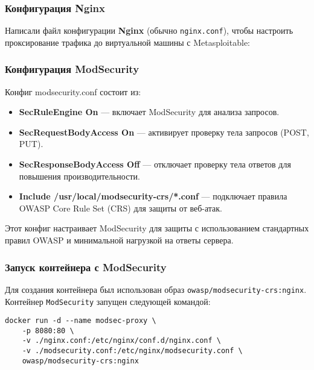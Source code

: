 \subsubsection{Конфигурация Nginx}

Написали файл конфигурации \textbf{Nginx} (обычно \texttt{nginx.conf}),
чтобы настроить проксирование трафика до виртуальной машины с Metasploitable:



\subsubsection{Конфигурация ModSecurity}

Конфиг modsecurity.conf состоит из:

\begin{itemize}
	\item \textbf{SecRuleEngine On}
		--- включает ModSecurity для анализа запросов.
	\item \textbf{SecRequestBodyAccess On}
		--- активирует проверку тела запросов (POST, PUT).
	\item \textbf{SecResponseBodyAccess Off}
		--- отключает проверку тела ответов для повышения производительности.
	\item \textbf{Include /usr/local/modsecurity-crs/*.conf}
		--- подключает правила OWASP Core Rule Set (CRS)
		для защиты от веб-атак.
\end{itemize}

Этот конфиг настраивает ModSecurity
для защиты с использованием стандартных правил OWASP
и минимальной нагрузкой на ответы сервера.

\break



\subsubsection{Запуск контейнера с ModSecurity}

Для создания контейнера был использован образ 
\texttt{owasp/modsecurity-crs:nginx}.
Контейнер \texttt{ModSecurity} запущен следующей командой:

\begin{verbatim}
docker run -d --name modsec-proxy \
	-p 8080:80 \
	-v ./nginx.conf:/etc/nginx/conf.d/nginx.conf \
	-v ./modsecurity.conf:/etc/nginx/modsecurity.conf \
	owasp/modsecurity-crs:nginx
\end{verbatim}

